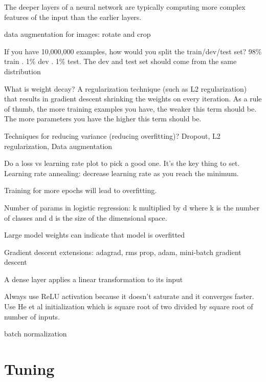 \documentclass[]{book}
\begin{document}
The deeper layers of a neural network are typically computing more
complex features of the input than the earlier layers.

data augmentation for images: rotate and crop

If you have 10,000,000 examples, how would you split the train/dev/test
set? 98\% train . 1\% dev . 1\% test. The dev and test set should come
from the same distribution

What is weight decay? A regularization technique (such as L2
regularization) that results in gradient descent shrinking the weights
on every iteration. As a rule of thumb, the more training examples you
have, the weaker this term should be. The more parameters you have the
higher this term should be.

Techniques for reducing variance (reducing overfitting)? Dropout, L2
regularization, Data augmentation

Do a loss vs learning rate plot to pick a good one. It's the key thing
to set. Learning rate annealing: decrease learning rate as you reach the
minimum.

Training for more epochs will lead to overfitting.

Number of params in logistic regression: k multiplied by d where k is
the number of classes and d is the size of the dimensional space.

Large model weights can indicate that model is overfitted

Gradient descent extensions: adagrad, rms prop, adam, mini-batch
gradient descent

A dense layer applies a linear transformation to its input

Always use ReLU activation because it doesn't saturate and it converges
faster. Use He et al initialization which is square root of two divided
by square root of number of inputs.

batch normalization

\section{Tuning}\label{tuning}
\end{document}
